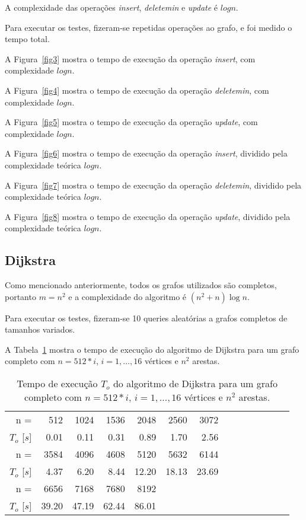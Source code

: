 \documentclass{article}
\begin{document}
A complexidade das operações \emph{insert}, \emph{deletemin} e \emph{update} é $ log n $.

Para executar os testes, fizeram-se repetidas operações ao grafo, e foi medido o tempo total.

A Figura~\ref{fig3} mostra o tempo de execução da operação \emph{insert}, com complexidade $log n$.

A Figura~\ref{fig4} mostra o tempo de execução da operação \emph{deletemin}, com complexidade $log n$.

A Figura~\ref{fig5} mostra o tempo de execução da operação \emph{update}, com complexidade $log n$.

A Figura~\ref{fig6} mostra o tempo de execução da operação \emph{insert}, dividido pela complexidade teórica $log n$.

A Figura~\ref{fig7} mostra o tempo de execução da operação \emph{deletemin}, dividido pela complexidade teórica $log n$.

A Figura~\ref{fig8} mostra o tempo de execução da operação \emph{update}, dividido pela complexidade teórica $log n$.

\subsection{Dijkstra}

Como mencionado anteriormente, todos os grafos utilizados são completos, portanto $m=n^2$ e a complexidade do algoritmo é $(n^2 + n) \log n$.

Para executar os testes, fizeram-se 10 queries aleatórias a grafos completos de tamanhos variados.

A Tabela~\ref{tab1} mostra o tempo de execução do algoritmo de Dijkstra para um grafo completo com $n=512 * i$, $i=1,\ldots,16$ vértices e $n ^ 2$ arestas.


\begin{table}
  \centering
  \begin{tabular}{rrrrrrrrrrrrrr}
    \hline
    n =             & 512  & 1024 & 1536 & 2048 & 2560 & 3072        \\
    $T_o$ [$s$]     & 0.01 & 0.11 & 0.31 & 0.89 & 1.70 & 2.56     \\
    \hline
    n =             & 3584 & 4096  & 4608 & 5120  & 5632  & 6144  \\
    $T_o$ [$s$]     & 4.37 & 6.20  & 8.44 & 12.20 & 18.13 & 23.69 \\
    \hline
    n =             & 6656  & 7168  & 7680  & 8192  \\
    $T_o$ [$s$]     & 39.20 & 47.19 & 62.44 & 86.01 \\
    \hline
  \end{tabular}
  \caption{Tempo de execução $T_o$ do algoritmo de Dijkstra para um grafo completo com $n=512 * i$, $i=1,\ldots,16$ vértices e $n ^ 2$ arestas.}
  \label{tab1}
\end{table}
\end{document}
